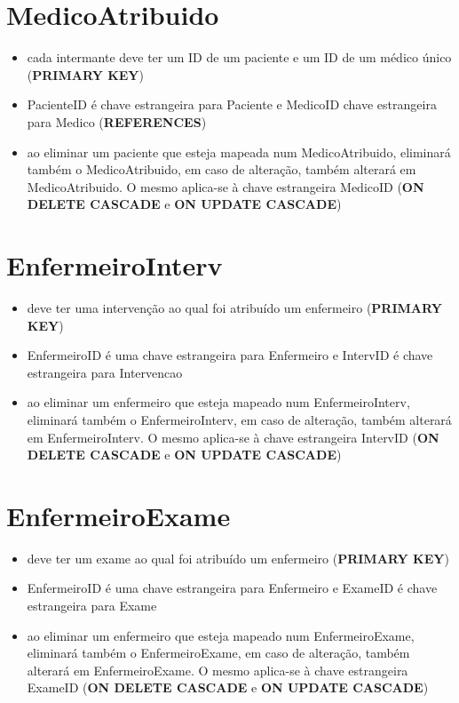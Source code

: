 \documentclass[article, a4paper, 12pt, oneside]{memoir}
\begin{document}
\section*{MedicoAtribuido}
\begin{itemize}
	\item cada intermante deve ter um ID de um paciente e um ID de um médico único (\textbf{PRIMARY KEY})
	\item PacienteID é chave estrangeira para Paciente e MedicoID chave estrangeira para Medico (\textbf{REFERENCES})
	\item ao eliminar um paciente que esteja mapeada num MedicoAtribuido, eliminará também o MedicoAtribuido, em caso de alteração, também alterará em MedicoAtribuido. O mesmo aplica-se à chave estrangeira MedicoID (\textbf{ON DELETE CASCADE} e \textbf{ON UPDATE CASCADE})
\end{itemize}

\section*{EnfermeiroInterv}
\begin{itemize}
	\item deve ter uma intervenção ao qual foi atribuído um enfermeiro (\textbf{PRIMARY KEY})
	\item EnfermeiroID é uma chave estrangeira para Enfermeiro e IntervID é chave estrangeira para Intervencao
	\item ao eliminar um enfermeiro que esteja mapeado num EnfermeiroInterv, eliminará também o EnfermeiroInterv, em caso de alteração, também alterará em EnfermeiroInterv. O mesmo aplica-se à chave estrangeira IntervID (\textbf{ON DELETE CASCADE} e \textbf{ON UPDATE CASCADE})
\end{itemize}

\section*{EnfermeiroExame}
\begin{itemize}
	\item deve ter um exame ao qual foi atribuído um enfermeiro (\textbf{PRIMARY KEY})
	\item EnfermeiroID é uma chave estrangeira para Enfermeiro e ExameID é chave estrangeira para Exame
	\item ao eliminar um enfermeiro que esteja mapeado num EnfermeiroExame, eliminará também o EnfermeiroExame, em caso de alteração, também alterará em EnfermeiroExame. O mesmo aplica-se à chave estrangeira ExameID (\textbf{ON DELETE CASCADE} e \textbf{ON UPDATE CASCADE})
\end{itemize}
\end{document}
